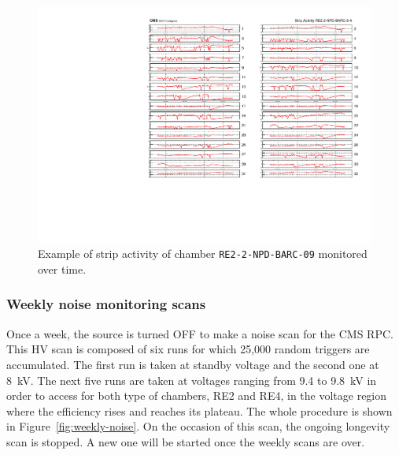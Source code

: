 	\begin{figure}[H]
        \centering
		\includegraphics[width = \linewidth]{fig/chapt5/GIFpp-Strip-Activity.pdf}
		\caption{\label{fig:stripactivity} Example of strip activity of chamber \texttt{RE2-2-NPD-BARC-09} monitored over time.}
	\end{figure}
	
		\subsubsection{Weekly noise monitoring scans}
		\label{chapt5:sssec:noisescan}
		
	Once a week, the source is turned OFF to make a noise scan for the CMS RPC. This HV scan is composed of six runs for which 25,000 random triggers are accumulated. The first run is taken at standby voltage and the second one at \SI{8}{kV}. The next five runs are taken at voltages ranging from 9.4 to \SI{9.8}{kV} in order to access for both type of chambers, RE2 and RE4, in the voltage region where the efficiency rises and reaches its plateau. The whole procedure is shown in Figure~\ref{fig:weekly-noise}. On the occasion of this scan, the ongoing longevity scan is stopped. A new one will be started once the weekly scans are over.
	
